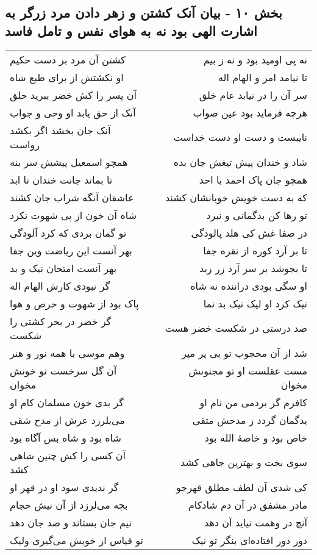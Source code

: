 \begin{center}
\section*{بخش ۱۰ - بیان آنک کشتن و زهر دادن مرد زرگر به اشارت الهی بود نه به هوای نفس و تامل فاسد}
\label{sec:sh010}
\begin{longtable}{l p{0.5cm} r}
کشتن آن مرد بر دست حکیم
&&
نه پی اومید بود و نه ز بیم
\\
او نکشتش از برای طبع شاه
&&
تا نیامد امر و الهام اله
\\
آن پسر را کش خضر ببرید حلق
&&
سر آن را در نیابد عام خلق
\\
آنک از حق یابد او وحی و جواب
&&
هرچه فرماید بود عین صواب
\\
آنک جان بخشد اگر بکشد رواست
&&
نایبست و دست او دست خداست
\\
همچو اسمعیل پیشش سر بنه
&&
شاد و خندان پیش تیغش جان بده
\\
تا بماند جانت خندان تا ابد
&&
همچو جان پاک احمد با احد
\\
عاشقان آنگه شراب جان کشند
&&
که به دست خویش خوبانشان کشند
\\
شاه آن خون از پی شهوت نکرد
&&
تو رها کن بدگمانی و نبرد
\\
تو گمان بردی که کرد آلودگی
&&
در صفا غش کی هلد پالودگی
\\
بهر آنست این ریاضت وین جفا
&&
تا بر آرد کوره از نقره جفا
\\
بهر آنست امتحان نیک و بد
&&
تا بجوشد بر سر آرد زر زبد
\\
گر نبودی کارش الهام اله
&&
او سگی بودی دراننده نه شاه
\\
پاک بود از شهوت و حرص و هوا
&&
نیک کرد او لیک نیک بد نما
\\
گر خضر در بحر کشتی را شکست
&&
صد درستی در شکست خضر هست
\\
وهم موسی با همه نور و هنر
&&
شد از آن محجوب تو بی پر مپر
\\
آن گل سرخست تو خونش مخوان
&&
مست عقلست او تو مجنونش مخوان
\\
گر بدی خون مسلمان کام او
&&
کافرم گر بردمی من نام او
\\
می‌بلرزد عرش از مدح شقی
&&
بدگمان گردد ز مدحش متقی
\\
شاه بود و شاه بس آگاه بود
&&
خاص بود و خاصهٔ الله بود
\\
آن کسی را کش چنین شاهی کشد
&&
سوی بخت و بهترین جاهی کشد
\\
گر ندیدی سود او در قهر او
&&
کی شدی آن لطف مطلق قهرجو
\\
بچه می‌لرزد از آن نیش حجام
&&
مادر مشفق در آن دم شادکام
\\
نیم جان بستاند و صد جان دهد
&&
آنچ در وهمت نیاید آن دهد
\\
تو قیاس از خویش می‌گیری ولیک
&&
دور دور افتاده‌ای بنگر تو نیک
\\
\end{longtable}
\end{center}
